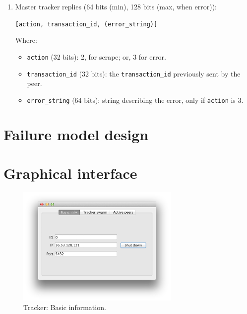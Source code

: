 \documentclass[twoside,a4paper,10pt]{article}
\begin{document}
\begin{itemize}
\begin{itemize}
\begin{enumerate}
    \item Master tracker replies (64 bits (min), 128 bits (max, when error)):
      
      \texttt{[action, transaction\_id, (error\_string)]}

      Where:
      \begin{itemize}
      \item \texttt{action} (32 bits): 2, for scrape; or, 3 for error.
      \item \texttt{transaction\_id} (32 bits): the \texttt{transaction\_id}
        previously sent by the peer.
      \item \texttt{error\_string} (64 bits): string describing the error,
        only if \texttt{action} is 3.
      \end{itemize}
    \end{enumerate}
  \end{itemize}
\end{itemize}

\section{Failure model design}

\section{Graphical interface}

\begin{figure}[!htp]
  \centering
  \includegraphics[width=0.7\textwidth]{imgs/tracker/basicInfo.png}
  \caption{\label{fig:basicInfo}Tracker: Basic information.}
\end{figure}



\end{document}
